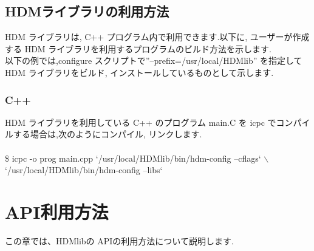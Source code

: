 \documentclass[twoside]{jbook}
\begin{document}
\begin{itemize}
\newpage

\section{HDMライブラリの利用方法}
HDM ライブラリは, C++ プログラム内で利用できます.以下に, ユーザーが作成する HDM ライブラリを利用するプログラムのビルド方法を示します.\\
以下の例では,configure スクリプトで”--prefix=/usr/local/HDMlib” を指定して HDM ライブラリをビルド, インストールしているものとして示します.

\subsection{C++}
HDM ライブラリを利用している C++ のプログラム main.C を icpc でコンパイルする場合は,次のようにコンパイル, リンクします.\\\\
{\sf
\$ icpc -o prog main.cpp ‘/usr/local/HDMlib/bin/hdm-config --cflags‘  $\backslash$ \\
‘/usr/local/HDMlib/bin/hdm-config --libs‘
}

\end{itemize}

\chapter{API利用方法}
この章では、HDMlibの APIの利用方法について説明します. 
\newpage
\end{document}
